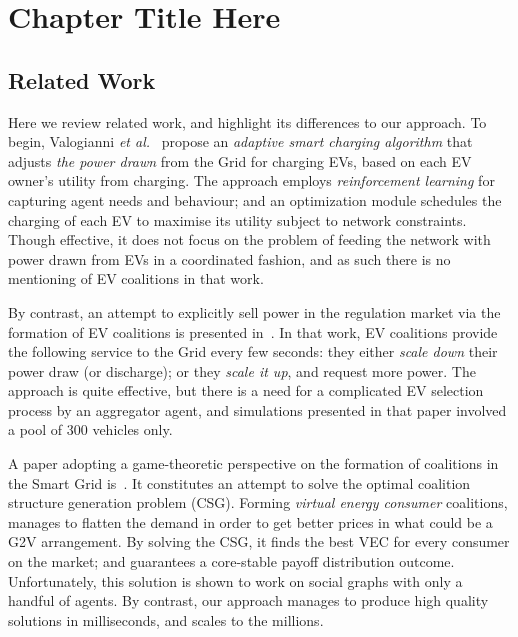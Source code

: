 
\chapter{Chapter Title Here} %

\label{Chapter1} %







\section{Related Work}
\label{sec:related}

Here we review related work, and highlight its differences to our approach.
To begin, Valogianni {\em et al.}~\cite{valogianni2014effective} propose an {\em adaptive smart charging algorithm} that adjusts {\em the power drawn} from the Grid for charging EVs, based on each EV owner's utility from charging. The approach employs {\em reinforcement learning} for capturing agent needs and behaviour; and an optimization module schedules the charging of each EV to maximise its utility subject to network constraints. Though effective, it does not focus on the problem of feeding the network with power drawn from EVs in a coordinated fashion, and as such there is no mentioning of EV coalitions in that work.

By contrast, an attempt to explicitly sell power in the regulation market via the formation of EV coalitions is presented in~\cite{kamboj2010exploring}. In that work, EV coalitions provide the following service to the Grid every few seconds: they either {\em scale down} their power draw (or discharge); or they {\em scale it up}, and request more power.
The approach is quite effective, but there is a need for a complicated EV selection process by an aggregator agent,
and simulations presented in that paper involved a pool of 300 vehicles only.

A paper adopting a game-theoretic perspective on the formation of coalitions in the Smart Grid is~\cite{vinyals2012stable}. It constitutes an attempt to solve the optimal coalition structure generation problem (CSG). Forming {\em virtual energy consumer} coalitions, manages to flatten the demand in order to get better prices in what could be a G2V arrangement. By solving the CSG, it finds the best VEC for every consumer on the market; and guarantees a core-stable payoff distribution outcome. Unfortunately, this solution is shown to work on social graphs with only a handful of agents. By contrast, our approach manages to produce high quality solutions in milliseconds, and scales to the millions.

